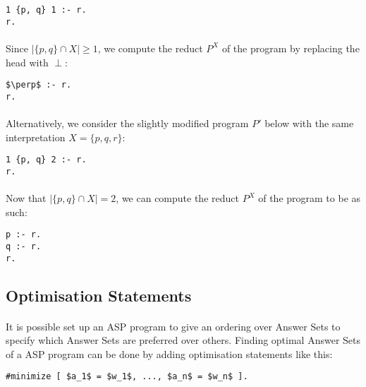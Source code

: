 \documentclass{article}
\theoremstyle{plain}
\theoremstyle{definition}
\begin{document}
\begin{multicols}{2}
\begin{lstlisting}
1 {p, q} 1 :- r.
r.
\end{lstlisting}

\paragraph{} Since $| \{ p, q \} \cap X | \geq 1$, we compute the reduct $P^X$ of the program by replacing the head with $\perp$:

\begin{lstlisting}[mathescape=true]
$\perp$ :- r.
r.
\end{lstlisting}

\paragraph{} Alternatively, we consider the slightly modified program $P'$ below with the same interpretation $X = \{p, q, r\}$:

\begin{lstlisting}
1 {p, q} 2 :- r.
r.
\end{lstlisting}

\paragraph{} Now that $| \{ p, q \} \cap X | = 2$, we can compute the reduct $P^X$ of the program to be as such:

\begin{lstlisting}
p :- r.
q :- r.
r.
\end{lstlisting}

\subsection{Optimisation Statements}

\paragraph{} It is possible set up an ASP program to give an ordering over Answer Sets to specify which Answer Sets are preferred over others. Finding optimal Answer Sets of a ASP program can be done by adding optimisation statements like this:

\begin{lstlisting}[mathescape=true]
#minimize [ $a_1$ = $w_1$, ..., $a_n$ = $w_n$ ].
\end{lstlisting}


\end{multicols}
\end{document}

